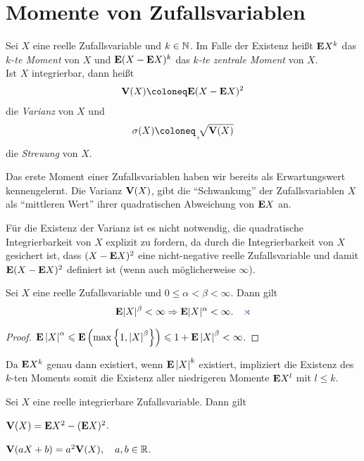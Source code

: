 \section{Momente von Zufallsvariablen}

\begin{defn}
\label{defn:4.5}
Sei $X$ eine reelle Zufallsvariable und $k \in \mathbb{N}$. Im Falle der Existenz
heißt $\textbf{E} X^{k}$ das \emph{$k$-te  Moment} von $X$ und
$\textbf{E}(X-\textbf{E} X)^ {k}$ das \emph{$k$-te  zentrale Moment} von $X$.\\
Ist $X$ integrierbar, dann heißt
\begin{align*}
\V(X)\defl\E(X-\E X)^ {2}
\end{align*}
die \emph{Varianz} von $X$ und
\begin{align*}
\sigma (X) \defl _{_{_{ +}}}\!\! \sqrt{\V(X)}
\end{align*}
die \emph{Streuung} von $X$.\fishhere
\end{defn}

Das erste Moment einer Zufallsvariablen haben wir bereits als Erwartungswert
kennengelernt. Die Varianz $\textbf{V}(X)$, gibt die ``Schwankung'' der Zufallsvariablen
$X$ als ``mittleren Wert'' ihrer quadratischen Abweichung von $\textbf{E} X$ an.

Für die Existenz der Varianz ist es nicht notwendig, die quadratische
Integrierbarkeit von $X$ explizit zu fordern, da durch die Integrierbarkeit von
$X$ gesichert ist, dass $(X-\textbf{E} X)^2$ eine nicht-negative reelle Zufallsvariable
und damit $\textbf{E}(X-\textbf{E} X)^2$ definiert ist (wenn auch möglicherweise $\infty$).

\begin{lem}
\label{lem:4.2}
Sei $X$ eine reelle Zufallsvariable und $0\leq \alpha < \beta < \infty $. Dann
gilt
\begin{align*}
\E|X|^{\beta}< \infty \Rightarrow \E|X|^{\alpha}< \infty.\fishhere
\end{align*}
\end{lem}

\begin{proof}
$\textbf{E}\left|X\right|^\alpha \leqslant \textbf{E} \left(\max\left\{ 1,\left|X\right|^\beta \right\}\right) \leqslant 1 + \textbf{E}
\left|X\right|^\beta < \infty$.\qedhere
\end{proof}

Da $\textbf{E} X^k$ genau dann existiert, wenn $\textbf{E} \left|X\right|^k$ existiert, impliziert die
Existenz des $k$-ten Moments somit die Existenz aller niedrigeren Momente $\textbf{E}
X^l$ mit $l\le k$.

\begin{prop}
\label{prop:4.6}
Sei $X$ eine reelle integrierbare Zufallsvariable. Dann gilt
\begin{propenum}
\item
$\textbf{V}(X) =\textbf{E} X^ {2}-(\textbf{E} X)^ {2}$.
\item
$\textbf{V}(aX+b) = a^ {2}\textbf{V}(X),\quad a, b \in \mathbb{R}$.\fishhere
\end{propenum}
\end{prop}


